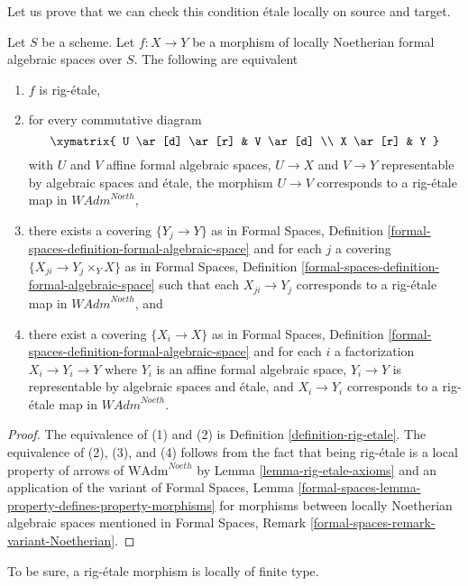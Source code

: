 \noindent
Let us prove that we can check this condition \'etale locally on
source and target.

\begin{lemma}
\label{lemma-rig-etale-morphisms}
Let $S$ be a scheme. Let $f : X \to Y$ be a morphism of
locally Noetherian formal algebraic spaces over $S$.
The following are equivalent
\begin{enumerate}
\item $f$ is rig-\'etale,
\item for every commutative diagram
$$
\xymatrix{
U \ar[d] \ar[r] & V \ar[d] \\
X \ar[r] & Y
}
$$
with $U$ and $V$ affine formal algebraic spaces, $U \to X$ and $V \to Y$
representable by algebraic spaces and \'etale, the morphism $U \to V$
corresponds to a rig-\'etale map in $\textit{WAdm}^{Noeth}$,
\item there exists a covering $\{Y_j \to Y\}$ as in
Formal Spaces,
Definition \ref{formal-spaces-definition-formal-algebraic-space}
and for each $j$
a covering $\{X_{ji} \to Y_j \times_Y X\}$ as in
Formal Spaces,
Definition \ref{formal-spaces-definition-formal-algebraic-space}
such that each $X_{ji} \to Y_j$  corresponds
to a rig-\'etale map in $\textit{WAdm}^{Noeth}$, and
\item there exist a covering $\{X_i \to X\}$ as in
Formal Spaces,
Definition \ref{formal-spaces-definition-formal-algebraic-space}
and for each $i$ a factorization $X_i \to Y_i \to Y$ where $Y_i$
is an affine formal algebraic space, $Y_i \to Y$ is representable
by algebraic spaces and \'etale, and $X_i \to Y_i$ corresponds
to a rig-\'etale map in $\textit{WAdm}^{Noeth}$.
\end{enumerate}
\end{lemma}

\begin{proof}
The equivalence of (1) and (2) is Definition \ref{definition-rig-etale}.
The equivalence of (2), (3), and (4) follows from the fact that
being rig-\'etale is a local property of arrows of
$\text{WAdm}^{Noeth}$ by Lemma \ref{lemma-rig-etale-axioms}
and an application of the variant of
Formal Spaces, Lemma
\ref{formal-spaces-lemma-property-defines-property-morphisms}
for morphisms between locally Noetherian algebraic spaces
mentioned in Formal Spaces, Remark
\ref{formal-spaces-remark-variant-Noetherian}.
\end{proof}

\noindent
To be sure, a rig-\'etale morphism is locally of finite type.


